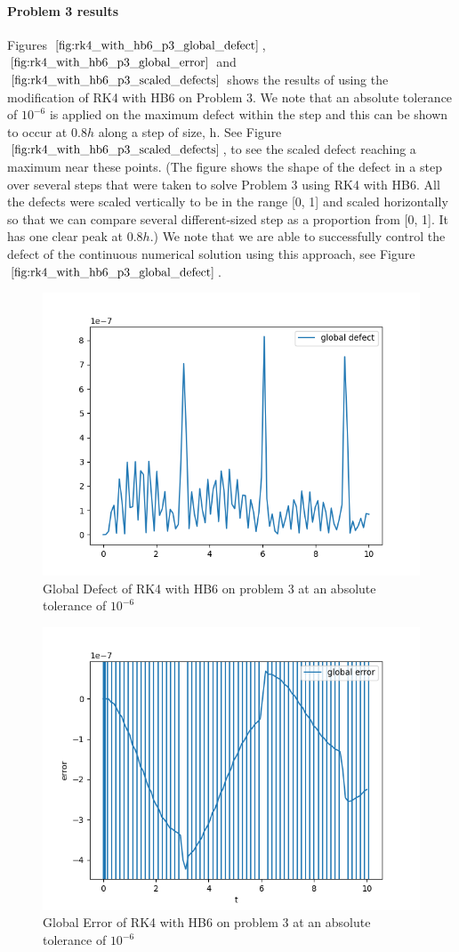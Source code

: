 \documentclass{article}
\begin{document}
\paragraph{Problem 3 results}
Figures $\ref{fig:rk4_with_hb6_p3_global_defect}$, $\ref{fig:rk4_with_hb6_p3_global_error}$ and $\ref{fig:rk4_with_hb6_p3_scaled_defects}$ shows the results of using the modification of RK4 with HB6 on Problem 3. We note that an absolute tolerance of $10^{-6}$ is applied on the maximum defect within the step and this can be shown to occur at $0.8h$ along a step of size, h. See Figure $\ref{fig:rk4_with_hb6_p3_scaled_defects}$, to see the scaled defect reaching a maximum near these points. (The figure shows the shape of the defect in a step over several steps that were taken to solve Problem 3 using RK4 with HB6. All the defects were scaled vertically to be in the range [0, 1] and scaled horizontally so that we can compare several different-sized step as a proportion from [0, 1]. It has one clear peak at $0.8h$.) We note that we are able to successfully control the defect of the continuous numerical solution using this approach, see Figure $\ref{fig:rk4_with_hb6_p3_global_defect}$. 


\begin{figure}[H]
\centering
\includegraphics[width=0.7\linewidth]{./figures/rk4_with_hb6_p3_global_defect}
\caption{Global Defect of RK4 with HB6 on problem 3 at an absolute tolerance of $10^{-6}$}
\label{fig:rk4_with_hb6_p3_global_defect}
\end{figure}

\begin{figure}[H]
\centering
\includegraphics[width=0.7\linewidth]{./figures/rk4_with_hb6_p3_global_error}
\caption{Global Error of RK4 with HB6 on problem 3 at an absolute tolerance of $10^{-6}$}
\label{fig:rk4_with_hb6_p3_global_error}
\end{figure}
\end{document}

